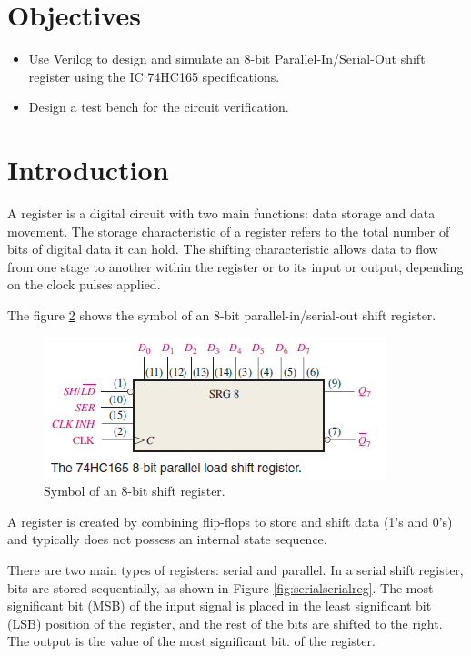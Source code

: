 \documentclass[9pt,technote]{IEEEtran}
\begin{document}
	
	\maketitle
	\section{Objectives}
	\begin{itemize}
		\item Use Verilog to design and simulate an 8-bit Parallel-In/Serial-Out shift register using the IC 74HC165 specifications.
		\item Design a test bench for the circuit verification.
	\end{itemize}
	
	\section{Introduction} 
	A register is a digital circuit with two main functions: data storage and data movement. The storage characteristic of a register refers to the total number of bits of digital data it can hold. The shifting characteristic allows data to flow from one stage to another within the register or to its input or output, depending on the clock pulses applied.\cite{floyd_fundamentos_nodate}
	
	The figure \ref{} shows the symbol of an 8-bit parallel-in/serial-out shift register.

	\begin{figure}[H]
		\centering
		\includegraphics[width=0.8\columnwidth]{Diagrama}
		\caption{Symbol of an 8-bit shift register.}
		\label{fig:diagrama}
	\end{figure}
	

	A register is created by combining flip-flops to store and shift data (1's and 0's) and typically does not possess an internal state sequence.

	There are two main types of registers: serial and parallel. In a serial shift register, bits are stored sequentially, as shown in Figure \ref{fig:serialserialreg}. The most significant bit (MSB) of the input signal is placed in the least significant bit (LSB) position of the register, and the rest of the bits are shifted to the right. The output is the value of the most significant bit. of the register.\cite{floyd_fundamentos_nodate}
	
\end{document}
